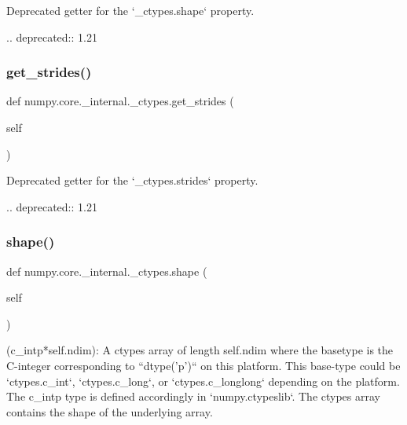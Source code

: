 \begin{DoxyVerb}Deprecated getter for the `_ctypes.shape` property.

.. deprecated:: 1.21
\end{DoxyVerb}
 \mbox{\label{classnumpy_1_1core_1_1__internal_1_1__ctypes_a285cdb09899dcc69ca6a863a399e6417}} 
\subsubsection{\texorpdfstring{get\+\_\+strides()}{get\_strides()}}
{\footnotesize\ttfamily def numpy.\+core.\+\_\+internal.\+\_\+ctypes.\+get\+\_\+strides (\begin{DoxyParamCaption}\item[{}]{self }\end{DoxyParamCaption})}

\begin{DoxyVerb}Deprecated getter for the `_ctypes.strides` property.

.. deprecated:: 1.21
\end{DoxyVerb}
 \mbox{\label{classnumpy_1_1core_1_1__internal_1_1__ctypes_ad540640e42cdc1a70b1408f75963915d}} 
\subsubsection{\texorpdfstring{shape()}{shape()}}
{\footnotesize\ttfamily def numpy.\+core.\+\_\+internal.\+\_\+ctypes.\+shape (\begin{DoxyParamCaption}\item[{}]{self }\end{DoxyParamCaption})}

\begin{DoxyVerb}(c_intp*self.ndim): A ctypes array of length self.ndim where
the basetype is the C-integer corresponding to ``dtype('p')`` on this
platform. This base-type could be `ctypes.c_int`, `ctypes.c_long`, or
`ctypes.c_longlong` depending on the platform.
The c_intp type is defined accordingly in `numpy.ctypeslib`.
The ctypes array contains the shape of the underlying array.
\end{DoxyVerb}
 \mbox{\label{classnumpy_1_1core_1_1__internal_1_1__ctypes_a470eb2d89822b0394bd7b3ab8b77ad67}} 

